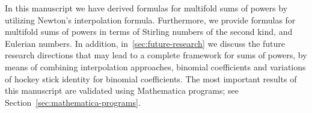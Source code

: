 In this manuscript we have derived formulas for multifold sums of
powers by utilizing
Newton's interpolation formula.
Furthermore, we provide formulas for multifold sums of powers in terms of
Stirling numbers of the second kind, and Eulerian numbers.
In addition, in~\eqref{sec:future-research} we discuss the future research
directions that may lead to a complete framework
for sums of powers, by means of combining interpolation approaches,
binomial coefficients and variations of
hockey stick identity for binomial coefficients.
The most important results of this manuscript are validated
using Mathematica programs;
see Section~\eqref{sec:mathematica-programs}.
